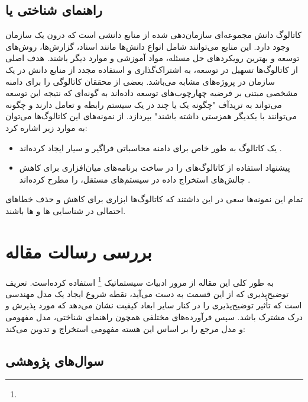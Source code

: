 \subsection{راهنمای شناختی یا }

کاتالوگ دانش مجموعه‌ای سازمان‌دهی شده از منابع دانشی است که درون یک سازمان وجود
دارد. این منابع می‌توانند شامل انواع دانش‌ها مانند اسناد، گزارش‌ها، روش‌های
توسعه و بهترین رویکرد‌های حل مسئله، مواد آموزشی و موارد دیگر باشند. هدف اصلی از
کاتالوگ‌ها تسهیل در توسعه، به اشتراک‌گذاری و استفاده مجدد از منابع دانش در یک
سازمان در پروژه‌های مشابه می‌باشد. بعضی از محققان کاتالوگی را برای دامنه مشخصی
مبتنی بر فرضیه چهارچوب‌های  توسعه داده‌اند به گونه‌ای که نتیجه این توسعه
می‌تواند به تریدآف "چگونه یک یا چند  در یک سیستم رابطه و تعامل دارند و
چگونه می‌توانند با یکدیگر همزستی داشته باشند" بپردازد. از نمونه‌های این
کاتالوگ‌ها می‌توان به موارد زیر اشاره کرد:

\begin{itemize}
    \item {} یک کاتالوگ به طور خاص برای دامنه محاسباتی
    فراگیر و سیار ایجاد کرده‌اند \cite{serrano2013ubiquitous}.
    \item {} پیشنهاد استفاده از کاتالوگ‌های  را در
    ساخت برنامه‌های میان‌افزاری  برای کاهش چالش‌های استخراج داده
     در سیستم‌های مستقل، را مطرح کرده‌اند \cite{torres2014nfr}.
\end{itemize}

تمام این نمونه‌ها سعی در این داشتند که کاتالوگ‌ها ابزاری برای کاهش و حذف خطا‌های
احتمالی در شناسایی ها و ها باشند.

\newpage

\section{بررسی رسالت مقاله}

به طور کلی این مقاله از مرور ادبیات سیستماتیک \footnote{} استفاده کرده‌است. تعریف توضیح‌پذیری که از این قسمت به
دست می‌آید، نقطه شروع ایجاد یک مدل مهندسی است که تأثیر توضیح‌پذیری را در کنار
سایر ابعاد کیفیت نشان می‌دهد که مورد پذیرش و درک مشترک باشد. سپس فرآورده‌های
مختلفی همچون راهنمای شناختی، مدل مفهومی و مدل مرجع را بر اساس این هسته مفهومی
استخراج و تدوین می‌کند:

\subsection{سوال‌های‌ پژوهشی}

